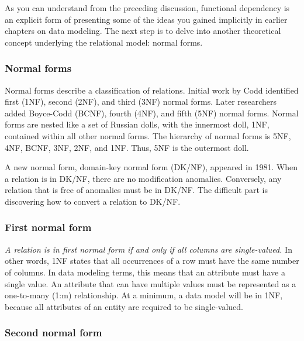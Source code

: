 \documentclass[
]{article}
\begin{document}
As you can understand from the preceding discussion, functional
dependency is an explicit form of presenting some of the ideas you
gained implicitly in earlier chapters on data modeling. The next step is
to delve into another theoretical concept underlying the relational
model: normal forms.

\hypertarget{normal-forms}{%
\subsubsection*{Normal forms}\label{normal-forms}}

Normal forms describe a classification of relations. Initial work by
Codd identified first (1NF), second (2NF), and third (3NF) normal forms.
Later researchers added Boyce-Codd (BCNF), fourth (4NF), and fifth (5NF)
normal forms. Normal forms are nested like a set of Russian dolls, with
the innermost doll, 1NF, contained within all other normal forms. The
hierarchy of normal forms is 5NF, 4NF, BCNF, 3NF, 2NF, and 1NF. Thus,
5NF is the outermost doll.

A new normal form, domain-key normal form (DK/NF), appeared in 1981.
When a relation is in DK/NF, there are no modification anomalies.
Conversely, any relation that is free of anomalies must be in DK/NF. The
difficult part is discovering how to convert a relation to DK/NF.

\hypertarget{first-normal-form}{%
\subsubsection*{First normal form}\label{first-normal-form}}

\emph{A relation is in first normal form if and only if all columns are
single-valued.} In other words, 1NF states that all occurrences of a row
must have the same number of columns. In data modeling terms, this means
that an attribute must have a single value. An attribute that can have
multiple values must be represented as a one-to-many (1:m) relationship.
At a minimum, a data model will be in 1NF, because all attributes of an
entity are required to be single-valued.

\hypertarget{second-normal-form}{%
\subsubsection*{Second normal form}\label{second-normal-form}}
\end{document}
